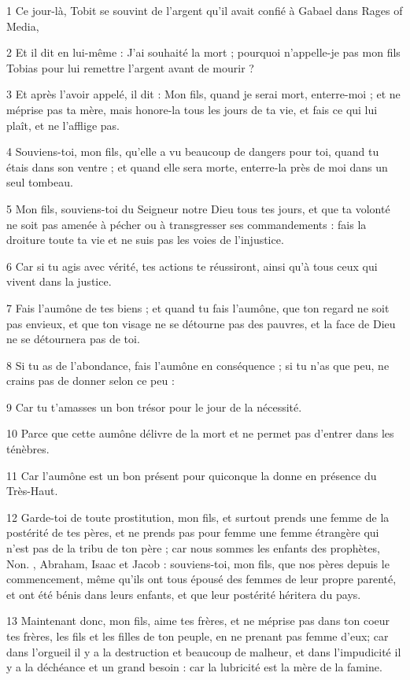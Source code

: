 \par 1 Ce jour-là, Tobit se souvint de l'argent qu'il avait confié à Gabael dans Rages of Media,
\par 2 Et il dit en lui-même : J'ai souhaité la mort ; pourquoi n'appelle-je pas mon fils Tobias pour lui remettre l'argent avant de mourir ?
\par 3 Et après l'avoir appelé, il dit : Mon fils, quand je serai mort, enterre-moi ; et ne méprise pas ta mère, mais honore-la tous les jours de ta vie, et fais ce qui lui plaît, et ne l'afflige pas.
\par 4 Souviens-toi, mon fils, qu'elle a vu beaucoup de dangers pour toi, quand tu étais dans son ventre ; et quand elle sera morte, enterre-la près de moi dans un seul tombeau.
\par 5 Mon fils, souviens-toi du Seigneur notre Dieu tous tes jours, et que ta volonté ne soit pas amenée à pécher ou à transgresser ses commandements : fais la droiture toute ta vie et ne suis pas les voies de l'injustice.
\par 6 Car si tu agis avec vérité, tes actions te réussiront, ainsi qu'à tous ceux qui vivent dans la justice.
\par 7 Fais l'aumône de tes biens ; et quand tu fais l'aumône, que ton regard ne soit pas envieux, et que ton visage ne se détourne pas des pauvres, et la face de Dieu ne se détournera pas de toi.
\par 8 Si tu as de l'abondance, fais l'aumône en conséquence ; si tu n'as que peu, ne crains pas de donner selon ce peu :
\par 9 Car tu t'amasses un bon trésor pour le jour de la nécessité.
\par 10 Parce que cette aumône délivre de la mort et ne permet pas d'entrer dans les ténèbres.
\par 11 Car l'aumône est un bon présent pour quiconque la donne en présence du Très-Haut.
\par 12 Garde-toi de toute prostitution, mon fils, et surtout prends une femme de la postérité de tes pères, et ne prends pas pour femme une femme étrangère qui n'est pas de la tribu de ton père ; car nous sommes les enfants des prophètes, Non. , Abraham, Isaac et Jacob : souviens-toi, mon fils, que nos pères depuis le commencement, même qu'ils ont tous épousé des femmes de leur propre parenté, et ont été bénis dans leurs enfants, et que leur postérité héritera du pays.
\par 13 Maintenant donc, mon fils, aime tes frères, et ne méprise pas dans ton coeur tes frères, les fils et les filles de ton peuple, en ne prenant pas femme d'eux; car dans l'orgueil il y a la destruction et beaucoup de malheur, et dans l'impudicité il y a la déchéance et un grand besoin : car la lubricité est la mère de la famine.
